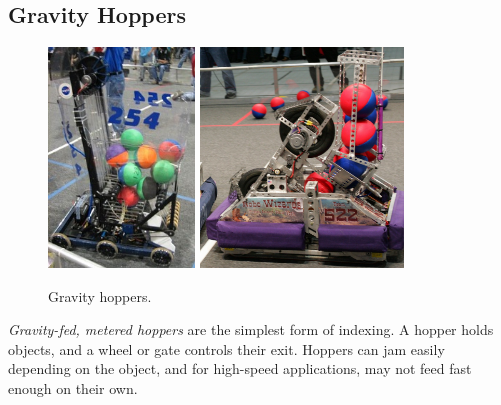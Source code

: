 \documentclass[10pt,letterpaper]{book}
\begin{document}
\subsection{Gravity Hoppers}
\begin{figure}[H]
	\includegraphics[height=2.3in]{imgs/hopper_gravity_1.jpeg}
	\includegraphics[height=2.3in]{imgs/hopper_gravity_2.png}
	\caption{Gravity hoppers.}
\end{figure}
\textit{Gravity-fed, metered hoppers} are the simplest form of indexing. A hopper holds objects, and a wheel or gate controls their exit. Hoppers can jam easily depending on the object, and for high-speed applications, may not feed fast enough on their own.
\end{document}
